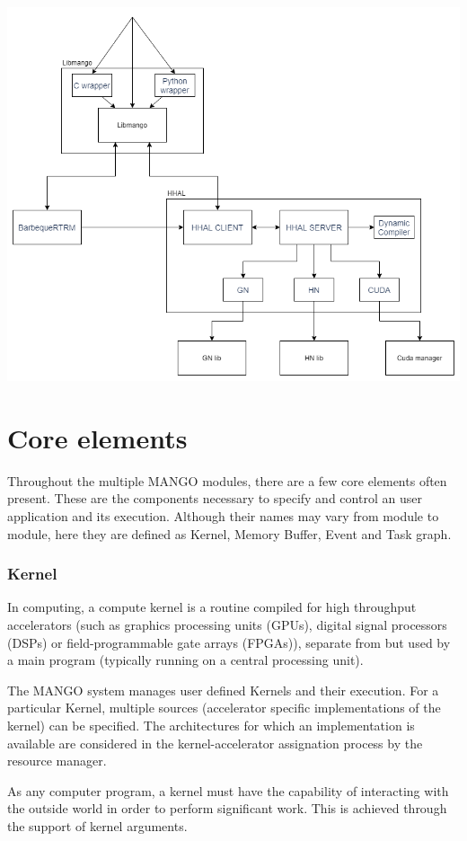 \includegraphics[scale=0.5]{img/architecture.png}

\section{Core elements}
Throughout the multiple MANGO modules, there are a few core elements often present. These are the components necessary to specify and control an user application and its execution. Although their names may vary from module to module, here they are defined as Kernel, Memory Buffer, Event and Task graph.

\subsubsection{Kernel}
In computing, a compute kernel is a routine compiled for high throughput accelerators (such as graphics processing units (GPUs), digital signal processors (DSPs) or field-programmable gate arrays (FPGAs)), separate from but used by a main program (typically running on a central processing unit). \cite{kernel_wikipedia}

The MANGO system manages user defined Kernels and their execution. For a particular Kernel, multiple sources (accelerator specific implementations of the kernel) can be specified. The architectures for which an implementation is available are considered in the kernel-accelerator assignation process by the resource manager. 

As any computer program, a kernel must have the capability of interacting with the outside world in order to perform significant work. This is achieved through the support of kernel arguments.

